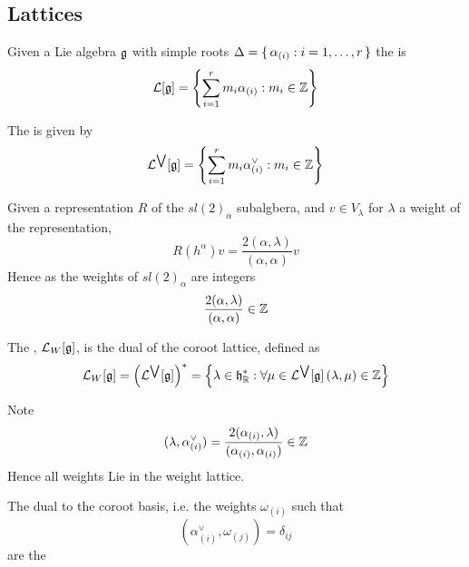 \documentclass{article}
\begin{document}
\subsection{Lattices}

\begin{definition}
	Given a Lie algebra $\mathfrak{g}$ with simple roots $\Delta=\set{  \alpha_{(i)} : i=1,\dots,r  }$ the  is 
	\[
	\mathcal{L} [\mathfrak{g}] = \left\{ \sum_{i=1}^r m_i \alpha_{(i)} : m_i \in\mathbb{Z} \right\}
	\]
\end{definition}

\begin{definition}
	The  is given by 
	\[
	\mathcal{L}^{\bigvee} [\mathfrak{g}] =\left\{ \sum_{i=1}^r m_i \alpha^\vee_{(i)} : m_i \in\mathbb{Z} \right\}
	\]
\end{definition}

\begin{definition}
	Given a representation $R$ of the $sl(2)_\alpha$ subalgbera, and $v\in V_\lambda$ for $\lambda$ a weight of the representation,
	\[
	R(h^\alpha)v=\frac{2(\alpha,\lambda)}{(\alpha,\alpha)}v
	\]
	Hence as the weights of $sl(2)_\alpha$ are integers
	\[
	\frac{2(\alpha,\lambda)}{(\alpha,\alpha)} \in \mathbb{Z}
	\]
\end{definition}

\begin{definition}
	The , $\mathcal{L}_W [\mathfrak{g}]$, is the dual of the coroot lattice, defined as 
	\[
	\mathcal{L}_W [\mathfrak{g}] = \left( \mathcal{L}^{\bigvee} [\mathfrak{g}] \right)^\ast = \left\{ \lambda\in\mathfrak{h}^\ast_{\mathbb{R}} : \forall \mu\in\mathcal{L}^{\bigvee} [\mathfrak{g}] \, (\lambda, \mu) \in \mathbb{Z} \right\}
	\]
\end{definition}

\begin{theorem}
	Note 
	\[
	(\lambda, \alpha^\vee_{(i)})=\frac{2(\alpha_{(i)},\lambda)}{(\alpha_{(i)},\alpha_{(i)})} \in \mathbb{Z}
	\]
	Hence all weights Lie in the weight lattice. 
\end{theorem}



\begin{definition}
	The dual to the coroot basis, i.e. the weights $\omega_{(i)}$ such that 
	\[
	(\alpha^\vee_{(i)}, \omega_{(j)})=\delta_{ij}
	\]
	are the 
\end{definition}
\end{document}
